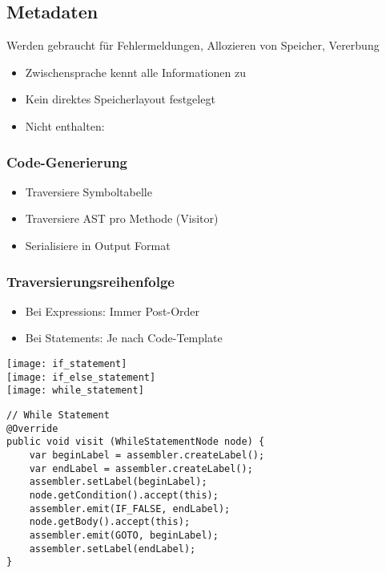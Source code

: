 \subsection{Metadaten}
Werden gebraucht für Fehlermeldungen, Allozieren von Speicher, Vererbung
\begin{itemize}[topsep=0pt]
    \itemsep -0.2em
    \item Zwischensprache kennt alle Informationen zu
    \item Kein direktes Speicherlayout festgelegt
    \item Nicht enthalten:
\end{itemize}

\subsubsection{Code-Generierung}
\begin{itemize}[topsep=0pt]
    \itemsep -0.2em
    \item Traversiere Symboltabelle
    \item Traversiere AST pro Methode (Visitor)
    \item Serialisiere in Output Format
\end{itemize}

\subsubsection{Traversierungsreihenfolge}
\begin{itemize}[topsep=0pt]
    \itemsep -0.2em
    \item Bei Expressions: Immer Post-Order
    \item Bei Statements: Je nach Code-Template
\end{itemize}
\texttt{[image: if\_statement]}\\
\linebreak
\texttt{[image: if\_else\_statement]}\\
\linebreak
\texttt{[image: while\_statement]}\\
\begin{lstlisting}
// While Statement
@Override
public void visit (WhileStatementNode node) {
    var beginLabel = assembler.createLabel();
    var endLabel = assembler.createLabel();
    assembler.setLabel(beginLabel);
    node.getCondition().accept(this);
    assembler.emit(IF_FALSE, endLabel);
    node.getBody().accept(this);
    assembler.emit(GOTO, beginLabel);
    assembler.setLabel(endLabel);
}
\end{lstlisting}

